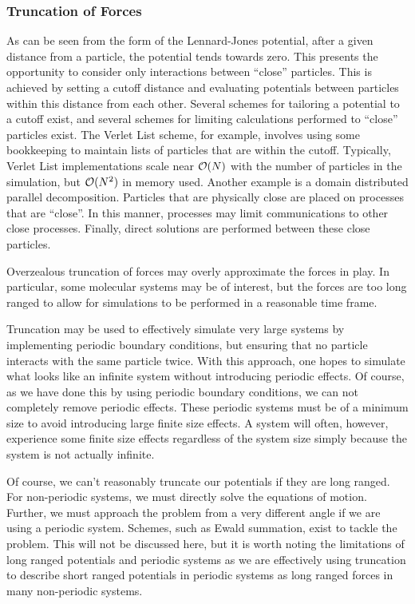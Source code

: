 \subsubsection{Truncation of Forces}
%
As can be seen from the form of the Lennard-Jones potential,
after a given distance from a particle, the potential tends towards
zero.
%
This presents the opportunity to consider only interactions between
``close'' particles.
%
This is achieved by setting a cutoff distance and evaluating potentials
between particles within this distance from each other.
%
Several schemes for tailoring a potential to a cutoff exist, and several
schemes for limiting calculations performed to ``close'' particles
exist.
%
The Verlet List scheme, for example, involves using some bookkeeping to
maintain lists of particles that are within the cutoff.
%
Typically, Verlet List implementations scale near $\mathcal{O}{(N)}$ with the
number of particles in the simulation, but $\mathcal{O}{(N^2)}$ in memory used.
%
Another example is a domain distributed parallel decomposition.
%
Particles that are physically close are placed on processes that are ``close''.
%
In this manner, processes may limit communications to other close processes.
%
Finally, direct solutions are performed between these close particles.

%
Overzealous truncation of forces may overly approximate the forces in play.
%
In particular, some molecular systems may be of interest, but the forces
are too long ranged to allow for simulations to be performed in
a reasonable time frame.

%
Truncation may be used to effectively simulate very large
systems by implementing periodic boundary conditions, but ensuring
that no particle interacts with the same particle twice.
%
With this approach, one hopes to simulate what looks like an infinite system
without introducing periodic effects.
%
Of course, as we have done this by using periodic boundary conditions,
we can not completely remove periodic effects.
%
These periodic systems must be of a minimum size to avoid introducing
large finite size effects.
%
A system will often, however, experience some finite size effects
regardless of the system size simply because the system is not actually
infinite.

%
Of course, we can't reasonably truncate our potentials if they are long ranged.
%
For non-periodic systems, we must directly solve the equations of motion.
%
Further, we must approach the problem from a very different angle if we
are using a periodic system.
%
Schemes, such as Ewald summation, exist to tackle the problem.
%
This will not be discussed here, but it is worth noting the limitations of
long ranged potentials and periodic systems as we are effectively using
truncation to describe short ranged potentials in periodic systems as
long ranged forces in many non-periodic systems.


